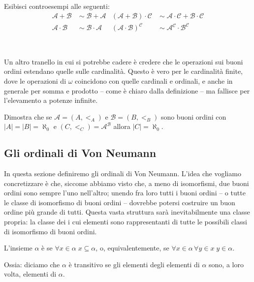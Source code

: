 \begin{exercise}
	Esibisci {\drkred controesempi} alle seguenti:
	{\drkred \begin{align*}
		\mathcal A + \mathcal B \;&\sim\; \mathcal B + \mathcal A
&(\mathcal A + \mathcal B) \cdot \mathcal C \;&\sim\; \mathcal A \cdot \mathcal C + \mathcal B \cdot \mathcal C \\
		\mathcal A \cdot \mathcal B \;&\sim\; \mathcal B \cdot
\mathcal A &(\mathcal A \cdot \mathcal B)^{\mathcal C} \;&\sim\; \mathcal A^{\mathcal C} \cdot \mathcal B^{\mathcal C}
	\end{align*}}

\baselineskip
\ 
\end{exercise}
Un altro tranello in cui si potrebbe cadere \`e credere che le operazioni
sui buoni ordini estendano quelle sulle cardinalit\`a. Questo \`e vero per le cardinalit\`a finite, dove le operazioni di $\omega$ coincidono con quelle cardinali e ordinali, e anche in generale 
per somma e prodotto -- come \`e chiaro dalla definizione -- ma fallisce
per l'elevamento a potenze infinite.

\begin{exercise}
	Dimostra che se $\mathcal A = (A,<_A)$ e $\mathcal B = (B,<_B)$ sono buoni ordini con $|A| = |B| = \aleph_0$ e $(C,<_C) = \mathcal A^{\mathcal B}$ allora $|C| = \aleph_0$.
\end{exercise}

\vfill\pagebreak

\subsection{Gli ordinali di Von Neumann}
In questa sezione definiremo gli ordinali di Von Neumann. L'idea che vogliamo concretizzare \`e che, siccome abbiamo visto che, 
a meno di isomorfismi, due buoni ordini sono sempre l'uno nell'altro;
unendo fra loro tutti i buoni ordini -- o tutte le classe di isomorfismo 
di buoni ordini -- dovrebbe potersi costruire un buon ordine pi\`u grande di tutti. Questa vasta struttura sar\`a inevitabilmente una classe propria:
la classe dei \vocab{numeri ordinali,} i cui elementi sono rappresentanti di tutte le possibili classi di isomorfismo di buoni ordini.

\begin{definition}
	L'insieme $\alpha$ \`e  se $\forall {x \in
\alpha} \; x \subseteq \alpha$, o, equivalentemente, se $\forall {x \in
\alpha} \, \forall {y \in x} \; y \in \alpha$.

{\drkgrn Ossia: diciamo che $\alpha$ \`e transitivo se gli elementi degli
elementi di $\alpha$ sono, a loro volta, elementi di $\alpha$.}
\end{definition}

